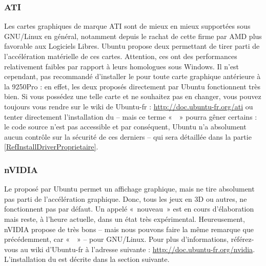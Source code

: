 \subsubsection{ATI}
Les cartes graphiques de marque ATI sont de mieux en mieux supportées sous GNU/Linux en général, notamment depuis le rachat de cette firme par AMD plus favorable aux Logiciels Libres. Ubuntu propose deux  permettant de tirer parti de l'accélération matérielle de ces cartes. Attention, ces  ont des performances relativement faibles par rapport à leurs homologues sous Windows. Il n'est cependant, pas recommandé d'installer le   pour toute carte graphique antérieure à la 9250Pro : en effet, les deux   proposés directement par Ubuntu fonctionnent très bien. Si vous possédez une telle carte et ne souhaitez pas en changer, vous pouvez toujours vous rendre sur le wiki de Ubuntu-fr : \url{http://doc.ubuntu-fr.org/ati} ou tenter directement l'installation du   -- mais ce terme «~~» pourra gêner certains : le code source n'est pas accessible et par conséquent, Ubuntu n'a absolument aucun contrôle sur la sécurité de ces derniers -- qui sera détaillée dans la partie \ref{RefInstallDriverProprietaire}.
\subsubsection{nVIDIA}
Le  proposé par Ubuntu permet un affichage graphique, mais ne tire absolument pas parti de l'accélération graphique. Donc, tous les jeux en 3D ou autres, ne fonctionnent pas par défaut. Un   appelé «~nouveau~» est en cours d'élaboration mais reste, à l'heure actuelle, dans un état très expérimental. Heureusement, nVIDIA propose de très bons   -- mais nous pouvons faire la même remarque que précédemment, car «~~» -- pour GNU/Linux. Pour plus d'informations, référez-vous au wiki d'Ubuntu-fr à l'adresse suivante : \url{http://doc.ubuntu-fr.org/nvidia}. L'installation du   est décrite dans la section suivante.
\newpage
